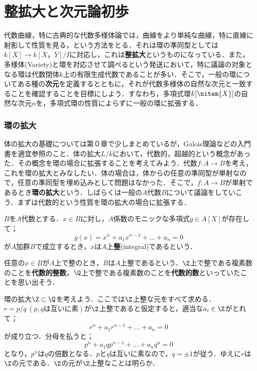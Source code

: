 \newpage
\part[Integral extension and The elemnts of dimension theory]{整拡大と次元論初歩}\label{part:整拡大と次元論初歩}

代数曲線，特に古典的な代数多様体論では，曲線をより単純な曲線，特に直線に射影して性質を見る，という方法をとる．それは環の準同型としては$k[X]\to k[X，Y]/I$に対応し，これは\textbf{整拡大}というものになっている．また，多様体(Variety)と環を対応させて調べるという発送において，特に議論の対象となる環は代数閉体$k$上の有限生成代数であることが多い．そこで，一般の環についてある種の\textbf{次元}を定義するとともに，それが代数多様体の自然な次元と一致することを確認することを目標にしよう．すなわち，多項式環$k[\nitem{X}]$の自然な次元$n$を，多項式環の性質によらずに一般の環に拡張する．

\section{環の拡大}

体の拡大の基礎については第０章で少しまとめているが，Galois理論などの入門書を適宜参照のこと．体の拡大$L/k$において，代数的，超越的という概念があった．その概念を環の場合に拡張することを考えてみよう．代数$f:A\to B$を考え，これを環の拡大とみなしたい．体の場合は，体からの任意の準同型が単射なので，任意の準同型を埋め込みとして問題はなかった．そこで，$f:A\to B$が単射であるとき\textbf{環の拡大}という．しばらくは一般の$A$代数$B$について議論をしていこう．まずは代数的という性質を環の拡大の場合に拡張する．

\begin{defi}[整]
	$B$を$A$代数とする．$x\in B$に対し，$A$係数のモニックな多項式$g\in A[X]$が存在して；
	\[g(x)=x^n+a_1x^{n-1}+\dots+a_n=0\]
	が$A$加群$B$で成立するとき，$x$は$A$上\textbf{整}(integral)であるという．
\end{defi}

任意の$x\in B$が$A$上で整のとき，$B$は$A$上整であるという．$\Z$上で整である複素数のことを\textbf{代数的整数}，$\Q$上で整である複素数のことを\textbf{代数的数}といっていたことを思い出そう．

\begin{ex}\label{ex:Q/Zの整閉包}
	環の拡大$\Z\subset\Q$を考えよう．ここでは$\Z$上整な元をすべて求める．$r=p/q ~(p,q\text{は互いに素})$が$\Z$上整であると仮定すると，適当な$a_i\in\Z$がとれて；
	\[r^n+a_1r^{n-1}+\dots+a_n=0\]
	が成り立つ．分母を払うと；
	\[p^n+a_1qp^{n-1}+\dots+a_nq^n=0\]
	となり，$p^n$は$q$の倍数となる．$p$と$q$は互いに素なので，$q=\pm 1$が従う．ゆえに$r$は$\Z$の元である．$\Z$の元が$\Z$上整なことは明らか．
\end{ex}

